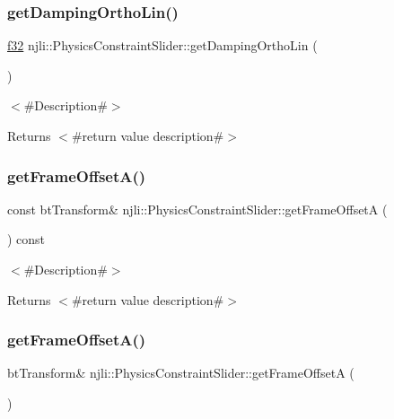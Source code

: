 \subsubsection{\texorpdfstring{get\+Damping\+Ortho\+Lin()}{getDampingOrthoLin()}}
{\footnotesize\ttfamily \mbox{\hyperlink{_util_8h_a5f6906312a689f27d70e9d086649d3fd}{f32}} njli\+::\+Physics\+Constraint\+Slider\+::get\+Damping\+Ortho\+Lin (\begin{DoxyParamCaption}{ }\end{DoxyParamCaption})}

$<$\#\+Description\#$>$

\begin{DoxyReturn}{Returns}
$<$\#return value description\#$>$ 
\end{DoxyReturn}
\mbox{\label{classnjli_1_1_physics_constraint_slider_a0ddd008beae3354d3eb6464d26f133bb}} 
\subsubsection{\texorpdfstring{get\+Frame\+Offset\+A()}{getFrameOffsetA()}\hspace{0.1cm}{\footnotesize\ttfamily [1/2]}}
{\footnotesize\ttfamily const bt\+Transform\& njli\+::\+Physics\+Constraint\+Slider\+::get\+Frame\+OffsetA (\begin{DoxyParamCaption}{ }\end{DoxyParamCaption}) const}

$<$\#\+Description\#$>$

\begin{DoxyReturn}{Returns}
$<$\#return value description\#$>$ 
\end{DoxyReturn}
\mbox{\label{classnjli_1_1_physics_constraint_slider_a51d8981be28fc9abdd9b044db032280a}} 
\subsubsection{\texorpdfstring{get\+Frame\+Offset\+A()}{getFrameOffsetA()}\hspace{0.1cm}{\footnotesize\ttfamily [2/2]}}
{\footnotesize\ttfamily bt\+Transform\& njli\+::\+Physics\+Constraint\+Slider\+::get\+Frame\+OffsetA (\begin{DoxyParamCaption}{ }\end{DoxyParamCaption})}

